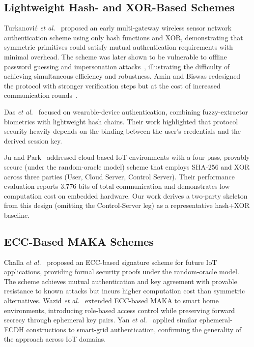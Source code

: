 \documentclass[journal]{IEEEtran}
\begin{document}
\subsection{Lightweight Hash- and XOR-Based Schemes}

Turkanovi\'{c} \emph{et al.}~\cite{Turkanovicetal2014} proposed an early
multi-gateway wireless sensor network authentication scheme using only hash
functions and XOR, demonstrating that symmetric primitives could satisfy
mutual authentication requirements with minimal overhead. The scheme was later
shown to be vulnerable to offline password guessing and impersonation
attacks~\cite{AminBiswas2016}, illustrating the difficulty of achieving
simultaneous efficiency and robustness. Amin and Biswas redesigned the
protocol with stronger verification steps but at the cost of increased
communication rounds~\cite{AminBiswas2016}.

Das \emph{et al.}~\cite{Dasetal2018} focused on wearable-device
authentication, combining fuzzy-extractor biometrics with lightweight hash
chains. Their work highlighted that protocol security heavily depends on
the binding between the user's credentials and the derived session key.

Ju and Park~\cite{JuPark2023} addressed cloud-based IoT environments with a
four-pass, provably secure (under the random-oracle model) scheme that
employs SHA-256 and XOR across three parties (User, Cloud Server, Control
Server). Their performance evaluation reports 3,776 bits of total
communication and demonstrates low computation cost on embedded hardware.
Our work derives a two-party skeleton from this design (omitting the
Control-Server leg) as a representative hash+XOR baseline.

\subsection{ECC-Based MAKA Schemes}

Challa \emph{et al.}~\cite{Challaetal2018} proposed an ECC-based signature
scheme for future IoT applications, providing formal security proofs under the
random-oracle model. The scheme achieves mutual authentication and key
agreement with provable resistance to known attacks but incurs higher
computation cost than symmetric alternatives. Wazid \emph{et
al.}~\cite{Wazidetal2019} extended ECC-based MAKA to smart home environments,
introducing role-based access control while preserving forward secrecy through
ephemeral key pairs. Yan \emph{et al.}~\cite{Yanetal2023} applied similar
ephemeral-ECDH constructions to smart-grid authentication, confirming the
generality of the approach across IoT domains.
\end{document}
